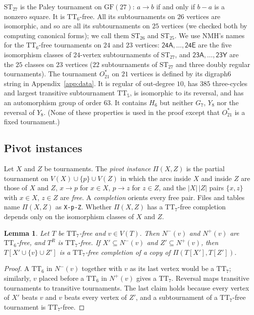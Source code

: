 \documentclass[11pt]{amsart}
\newtheorem{lemma}[theorem]{Lemma}
\theoremstyle{definition}
\theoremstyle{remark}
\newcommand{\TT}[1]{\mathrm{TT}_{#1}}
\newcommand{\ST}[1]{\mathrm{ST}_{#1}}
\newcommand{\Ostar}{O_{21}^{*}}
\newcommand{\cl}[1]{\textsf{#1}}
\newcommand{\Piv}[2]{\Pi(#1,#2)}
\newcommand{\Np}{N^{+}}
\newcommand{\Nm}{N^{-}}
\begin{document}
$\ST{27}$ is the Paley tournament on $\mathrm{GF}(27)$: $a \to b$ if and only if
$b-a$ is a nonzero square. It is $\TT{6}$-free. All its subtournaments on
$26$ vertices are isomorphic, and so are all its subtournaments on
$25$ vertices (we checked both by computing canonical forms); we call them
$\ST{26}$ and $\ST{25}$. We use NMH's names for the $\TT{6}$-free tournaments on
$24$ and $23$ vertices: $\cl{24A},\dots,\cl{24E}$ are the five isomorphism
classes of $24$-vertex subtournaments of $\ST{27}$, and
$\cl{23A},\dots,\cl{23Y}$ are the $25$ classes on $23$ vertices
($22$ subtournaments of $\ST{27}$ and three doubly regular tournaments).
The tournament $\Ostar$ on $21$ vertices is defined by its digraph6 string in
Appendix~\ref{app:data}. It is regular of out-degree $10$, has $385$
three-cycles and largest transitive subtournament $\TT{5}$, is isomorphic to its
reversal, and has an automorphism group of order $63$. It contains $H_6$ but
neither $G_7$, $Y_8$ nor the reversal of $Y_8$. (None of these properties is
used in the proof except that $\Ostar$ is a fixed tournament.)

\subsection{Pivot instances}
Let $X$ and $Z$ be tournaments. The \emph{pivot instance} $\Piv{X}{Z}$ is the
partial tournament on $V(X) \cup \{p\} \cup V(Z)$ in which the arcs inside $X$
and inside $Z$ are those of $X$ and $Z$, $x \to p$ for $x\in X$, $p \to z$ for
$z \in Z$, and the $|X|\,|Z|$ pairs $\{x,z\}$ with $x \in X$, $z\in Z$ are
\emph{free}. A \emph{completion} orients every free pair. Files and tables name
$\Piv{X}{Z}$ as \texttt{X-p-Z}. Whether $\Piv{X}{Z}$ has a $\TT{7}$-free
completion depends only on the isomorphism classes of $X$ and $Z$.

\begin{lemma}\label{lem:pivot}
Let $T$ be $\TT{7}$-free and $v \in V(T)$. Then $\Nm(v)$ and $\Np(v)$ are
$\TT{6}$-free, and $T^{R}$ is $\TT{7}$-free. If $X' \subseteq \Nm(v)$ and
$Z' \subseteq \Np(v)$, then $T[X' \cup \{v\} \cup Z']$ is a $\TT{7}$-free
completion of a copy of $\Piv{T[X']}{T[Z']}$.
\end{lemma}

\begin{proof}
A $\TT{6}$ in $\Nm(v)$ together with $v$ as its last vertex would be a $\TT{7}$;
similarly, $v$ placed before a $\TT{6}$ in $\Np(v)$ gives a $\TT{7}$. Reversal maps transitive
tournaments to transitive tournaments. The last claim holds because every
vertex of $X'$ beats $v$ and $v$ beats every vertex of $Z'$, and a
subtournament of a $\TT{7}$-free tournament is $\TT{7}$-free.
\end{proof}
\end{document}
